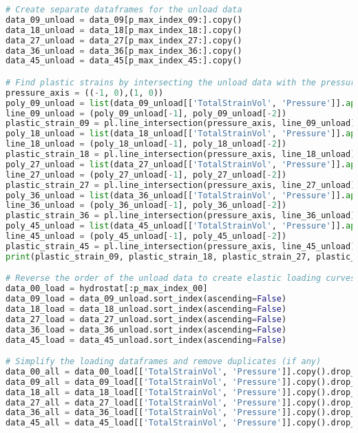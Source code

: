 \begin{lstlisting}[language=Python]
# Create separate dataframes for the unload data
data_09_unload = data_09[p_max_index_09:].copy()
data_18_unload = data_18[p_max_index_18:].copy()
data_27_unload = data_27[p_max_index_27:].copy()
data_36_unload = data_36[p_max_index_36:].copy()
data_45_unload = data_45[p_max_index_45:].copy()

# Find plastic strains by intersecting the unload data with the pressure axis
pressure_axis = ((-1, 0),(1, 0))
poly_09_unload = list(data_09_unload[['TotalStrainVol', 'Pressure']].apply(tuple, axis=1))
line_09_unload = (poly_09_unload[-1], poly_09_unload[-2])
plastic_strain_09 = pl.line_intersection(pressure_axis, line_09_unload)[0]
poly_18_unload = list(data_18_unload[['TotalStrainVol', 'Pressure']].apply(tuple, axis=1))
line_18_unload = (poly_18_unload[-1], poly_18_unload[-2])
plastic_strain_18 = pl.line_intersection(pressure_axis, line_18_unload)[0]
poly_27_unload = list(data_27_unload[['TotalStrainVol', 'Pressure']].apply(tuple, axis=1))
line_27_unload = (poly_27_unload[-1], poly_27_unload[-2])
plastic_strain_27 = pl.line_intersection(pressure_axis, line_27_unload)[0]
poly_36_unload = list(data_36_unload[['TotalStrainVol', 'Pressure']].apply(tuple, axis=1))
line_36_unload = (poly_36_unload[-1], poly_36_unload[-2])
plastic_strain_36 = pl.line_intersection(pressure_axis, line_36_unload)[0]
poly_45_unload = list(data_45_unload[['TotalStrainVol', 'Pressure']].apply(tuple, axis=1))
line_45_unload = (poly_45_unload[-1], poly_45_unload[-2])
plastic_strain_45 = pl.line_intersection(pressure_axis, line_45_unload)[0]
print(plastic_strain_09, plastic_strain_18, plastic_strain_27, plastic_strain_36, plastic_strain_45)

# Reverse the order of the unload data to create elastic loading curves
data_00_load = hydrostat[:p_max_index_00]
data_09_load = data_09_unload.sort_index(ascending=False)
data_18_load = data_18_unload.sort_index(ascending=False)
data_27_load = data_27_unload.sort_index(ascending=False)
data_36_load = data_36_unload.sort_index(ascending=False)
data_45_load = data_45_unload.sort_index(ascending=False)

# Simplify the loading dataframes and remove duplicates (if any)
data_00_all = data_00_load[['TotalStrainVol', 'Pressure']].copy().drop_duplicates()
data_09_all = data_09_load[['TotalStrainVol', 'Pressure']].copy().drop_duplicates()
data_18_all = data_18_load[['TotalStrainVol', 'Pressure']].copy().drop_duplicates()
data_27_all = data_27_load[['TotalStrainVol', 'Pressure']].copy().drop_duplicates()
data_36_all = data_36_load[['TotalStrainVol', 'Pressure']].copy().drop_duplicates()
data_45_all = data_45_load[['TotalStrainVol', 'Pressure']].copy().drop_duplicates()


\end{lstlisting}

